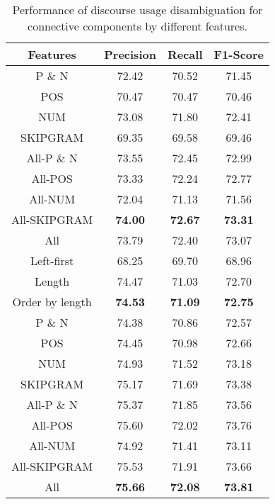 \begin{table}[h]
\centering
\begin{tabular}{|c|c|c|c|}
\hline

\bf Features            & \bf Precision & \bf Recall & \bf F1-Score \\ \hline
    P \& N              &     72.42     &     70.52  &     71.45    \\ \hline
    POS                 &     70.47     &     70.47  &     70.46    \\ \hline
    NUM                 &     73.08     &     71.80  &     72.41    \\ \hline
    SKIPGRAM            &     69.35     &     69.58  &     69.46    \\ \hline
    All-P \& N          &     73.55     &     72.45  &     72.99    \\ \hline
    All-POS             &     73.33     &     72.24  &     72.77    \\ \hline
    All-NUM             &     72.04     &     71.13  &     71.56    \\ \hline
    All-SKIPGRAM        & \bf 74.00     & \bf 72.67  & \bf 73.31    \\ \hline
    All                 &     73.79     &     72.40  &     73.07    \\

\hhline{|=|=|=|=|}

    Left-first          &     68.25     &     69.70  &     68.96    \\ \hline
    Length              &     74.47     &     71.03  &     72.70    \\ \hline
    Order by length     & \bf 74.53     & \bf 71.09  & \bf 72.75    \\

\hhline{|=|=|=|=|}


    P \& N              &     74.38     &     70.86  &     72.57    \\ \hline
    POS                 &     74.45     &     70.98  &     72.66    \\ \hline
    NUM                 &     74.93     &     71.52  &     73.18    \\ \hline
    SKIPGRAM            &     75.17     &     71.69  &     73.38    \\ \hline
    All-P \& N          &     75.37     &     71.85  &     73.56    \\ \hline
    All-POS             &     75.60     &     72.02  &     73.76    \\ \hline
    All-NUM             &     74.92     &     71.41  &     73.11    \\ \hline
    All-SKIPGRAM        &     75.53     &     71.91  &     73.66    \\ \hline
    All                 & \bf 75.66     & \bf 72.08  & \bf 73.81    \\

\end{tabular}
\caption{\label{t:recognition-features} Performance of discourse usage
disambiguation for connective components by different features. }
\end{table}
